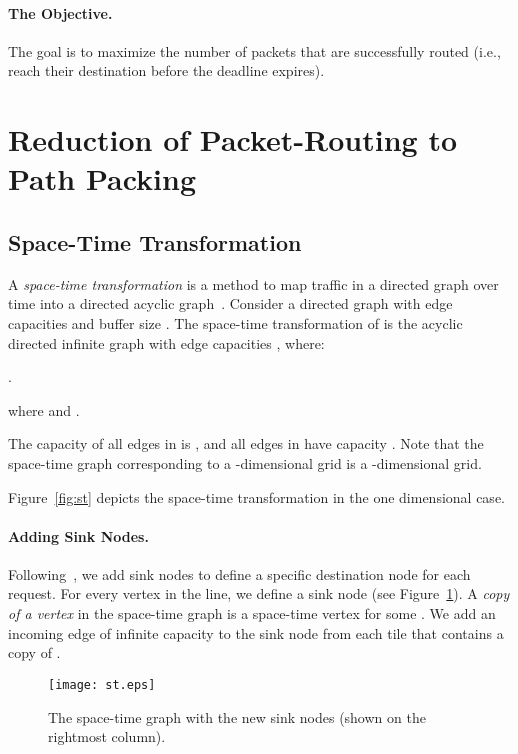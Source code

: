 \documentclass[11pt]{article}
\newenvironment{proof sketch}[1]{\noindent {\emph{Proof sketch of #1:}}}{\hfill \qed}
\begin{document}
\paragraph{The Objective.}
The goal is to maximize the number of packets that are
successfully routed (i.e., reach their destination before
the deadline expires).

\section{Reduction of Packet-Routing to Path Packing}
\label{sec:prelim}

\subsection{Space-Time Transformation}
\label{sec:spacetime}

A\emph{ space-time transformation} is a method to map traffic in a directed graph over time into a directed acyclic graph~\cite{AAF,ARSU,AZ,RR}. Consider a directed graph  with edge capacities  and buffer size .
The space-time transformation of  is the acyclic directed infinite graph  with edge capacities , where:
\begin{inparaenum}[(i)]
\item .
\item  where  and .
\item The capacity of all edges in  is , and all edges in  have capacity . Note that the space-time graph corresponding to a -dimensional grid is a -dimensional grid.
\end{inparaenum}
Figure~\ref{fig:st} depicts the space-time transformation in the one dimensional case.

\paragraph{Adding Sink Nodes.}
Following~\cite{AZ}, we add sink nodes to define a specific destination node for each request. For every vertex  in the line, we define a sink node
 (see Figure~\ref{fig:stsink}).
A \emph{copy of a vertex}  in the space-time graph  is a space-time vertex  for some .
We add an incoming edge of infinite capacity to the sink node  from each tile  that contains a copy  of .

\begin{figure}[h]\centering
\texttt{[image: st.eps]}
\caption{The space-time graph  with the new sink nodes (shown on the rightmost column).
}
\label{fig:stsink}
\end{figure}
\end{document}
